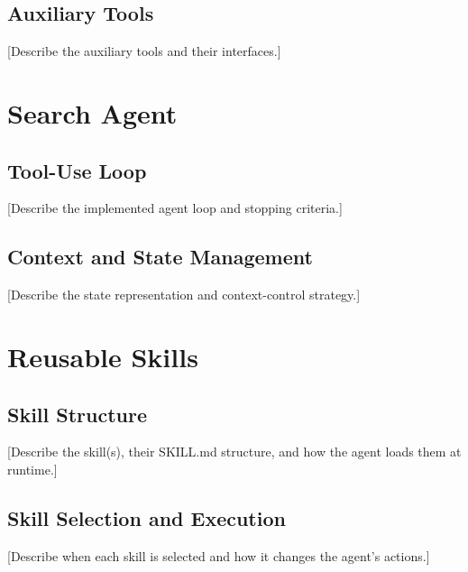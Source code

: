 \documentclass[sigconf]{acmart}
\begin{document}
\subsection{Auxiliary Tools}
[Describe the auxiliary tools and their interfaces.]

\section{Search Agent}
\subsection{Tool-Use Loop}
[Describe the implemented agent loop and stopping criteria.]

\subsection{Context and State Management}
[Describe the state representation and context-control strategy.]

\section{Reusable Skills}
\subsection{Skill Structure}
[Describe the skill(s), their SKILL.md structure, and how the agent loads them at runtime.]

\subsection{Skill Selection and Execution}
[Describe when each skill is selected and how it changes the agent's actions.]
\end{document}
